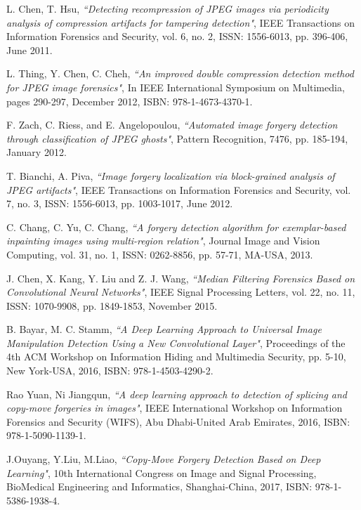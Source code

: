 L. Chen, T. Hsu,
\textit{``Detecting recompression of JPEG images via periodicity analysis of compression artifacts for tampering detection"},
IEEE Transactions on Information Forensics and Security,
vol. 6, no. 2, ISSN: 1556-6013, pp. 396-406, June 2011.

L. Thing, Y. Chen, C. Cheh,
\textit{``An improved double compression detection method for JPEG image forensics"},
In IEEE International Symposium on Multimedia,
pages 290-297, December 2012, ISBN: 978-1-4673-4370-1.

F. Zach, C. Riess, and E. Angelopoulou,
\textit{``Automated image forgery detection through classification of JPEG ghosts"},
Pattern Recognition, 7476, pp. 185-194, January 2012.

T. Bianchi, A. Piva,
\textit{``Image forgery localization via block-grained analysis of JPEG artifacts"},
IEEE Transactions on Information Forensics and Security,
vol. 7, no. 3, ISSN: 1556-6013, pp. 1003-1017, June 2012.

C. Chang, C. Yu, C. Chang,
\textit{``A forgery detection algorithm for exemplar-based inpainting images using multi-region relation"},
Journal Image and Vision Computing,
vol. 31, no. 1, ISSN: 0262-8856, pp. 57-71, MA-USA, 2013.


J. Chen, X. Kang, Y. Liu and Z. J. Wang,
\textit{``Median Filtering Forensics Based on Convolutional Neural Networks"},
IEEE Signal Processing Letters,
vol. 22, no. 11, ISSN: 1070-9908, pp. 1849-1853, November 2015.

B. Bayar, M. C. Stamm,
\textit{``A Deep Learning Approach to Universal Image Manipulation Detection Using a New Convolutional Layer"},
Proceedings of the 4th ACM Workshop on Information Hiding and Multimedia Security,
pp. 5-10, New York-USA, 2016, ISBN: 978-1-4503-4290-2.

Rao Yuan, Ni Jiangqun,
\textit{``A deep learning approach to detection of splicing and copy-move forgeries in images"},
IEEE International Workshop on Information Forensics and Security (WIFS),
Abu Dhabi-United Arab Emirates, 2016, ISBN: 978-1-5090-1139-1.

J.Ouyang, Y.Liu, M.Liao,
\textit{``Copy-Move Forgery Detection Based on Deep Learning"},
10th International Congress on Image and Signal Processing, BioMedical Engineering and Informatics,
Shanghai-China, 2017, ISBN: 978-1-5386-1938-4.

